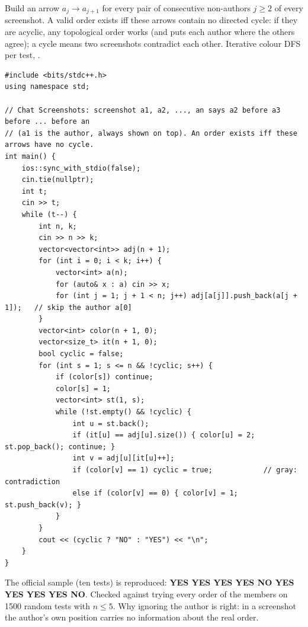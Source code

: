 \begin{solutionbox}
Build an arrow $a_j \to a_{j+1}$ for every pair of consecutive non-authors $j \ge 2$ of every screenshot. A valid order exists iff these arrows contain no directed cycle: if they are acyclic, any topological order works (and puts each author where the others agree); a cycle means two screenshots contradict each other. Iterative colour DFS per test, .
\begin{lstlisting}[style=cpp]
#include <bits/stdc++.h>
using namespace std;

// Chat Screenshots: screenshot a1, a2, ..., an says a2 before a3 before ... before an
// (a1 is the author, always shown on top). An order exists iff these arrows have no cycle.
int main() {
    ios::sync_with_stdio(false);
    cin.tie(nullptr);
    int t;
    cin >> t;
    while (t--) {
        int n, k;
        cin >> n >> k;
        vector<vector<int>> adj(n + 1);
        for (int i = 0; i < k; i++) {
            vector<int> a(n);
            for (auto& x : a) cin >> x;
            for (int j = 1; j + 1 < n; j++) adj[a[j]].push_back(a[j + 1]);   // skip the author a[0]
        }
        vector<int> color(n + 1, 0);
        vector<size_t> it(n + 1, 0);
        bool cyclic = false;
        for (int s = 1; s <= n && !cyclic; s++) {
            if (color[s]) continue;
            color[s] = 1;
            vector<int> st(1, s);
            while (!st.empty() && !cyclic) {
                int u = st.back();
                if (it[u] == adj[u].size()) { color[u] = 2; st.pop_back(); continue; }
                int v = adj[u][it[u]++];
                if (color[v] == 1) cyclic = true;            // gray: contradiction
                else if (color[v] == 0) { color[v] = 1; st.push_back(v); }
            }
        }
        cout << (cyclic ? "NO" : "YES") << "\n";
    }
}
\end{lstlisting}
The official sample (ten tests) is reproduced: \textbf{YES YES YES YES NO YES YES YES YES NO}. Checked against trying every order of the members on 1500 random tests with $n \le 5$. Why ignoring the author is right: in a screenshot the author's own position carries no information about the real order.
\end{solutionbox}

